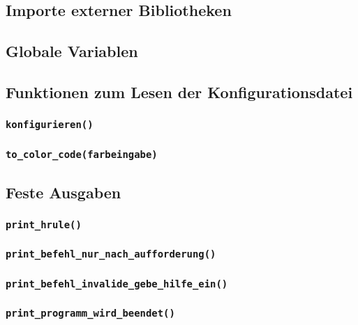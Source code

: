 \documentclass{article}
\begin{document}
\subsection{Importe externer Bibliotheken}

\subsection{Globale Variablen}


\subsection{Funktionen zum Lesen der Konfigurationsdatei}

\subsubsection*{\texttt{konfigurieren()}}\label{subsubsec:konfigurieren}

\subsubsection*{\texttt{to\_color\_code(farbeingabe)}}\label{subsubsec:to_color_code}


\subsection{Feste Ausgaben}

\subsubsection*{\texttt{print\_hrule()}}

\subsubsection*{\texttt{print\_befehl\_nur\_nach\_aufforderung()}}

\subsubsection*{\texttt{print\_befehl\_invalide\_gebe\_hilfe\_ein()}}

\subsubsection*{\texttt{print\_programm\_wird\_beendet()}}
\end{document}

